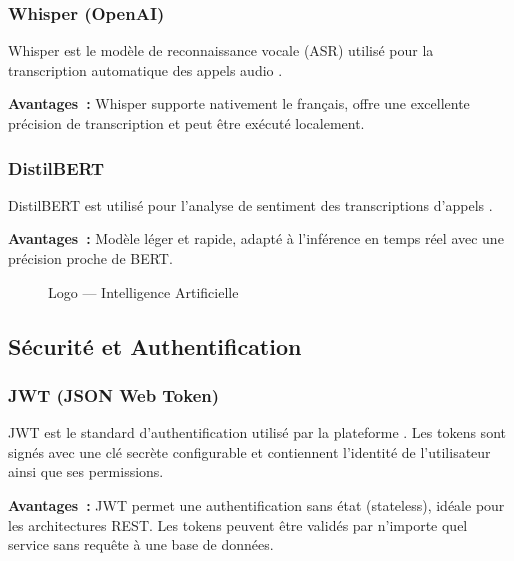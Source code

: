\subsubsection{Whisper (OpenAI)}

\noindent Whisper est le modèle de reconnaissance vocale (ASR) utilisé pour la
transcription automatique des appels audio \cite{Whisper}.

\textbf{Avantages~:} Whisper supporte nativement le français, offre une excellente
précision de transcription et peut être exécuté localement.

\subsubsection{DistilBERT}

\noindent DistilBERT est utilisé pour l'analyse de sentiment des transcriptions
d'appels \cite{DistilBERT}.

\textbf{Avantages~:} Modèle léger et rapide, adapté à l'inférence en temps réel
avec une précision proche de BERT.

\begin{figure}[H]
    \centering
    \caption{Logo --- Intelligence Artificielle}
    \label{fig:logo_ai}
\end{figure}

\subsection{Sécurité et Authentification}

\subsubsection{JWT (JSON Web Token)}

\noindent JWT est le standard d'authentification utilisé par la plateforme \cite{JWTRFC}.
Les tokens sont signés avec une clé secrète configurable et contiennent l'identité de
l'utilisateur ainsi que ses permissions.

\textbf{Avantages~:} JWT permet une authentification sans état (stateless), idéale pour
les architectures REST. Les tokens peuvent être validés par n'importe quel service sans
requête à une base de données.

